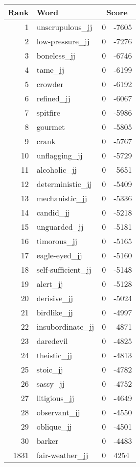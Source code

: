 \begin{longtable}[!htbp]{| rlr@{.}l |}
    \hline
    \textbf{Rank} & \textbf{Word} & \multicolumn{2}{c|}{\textbf{Score}} \\
    \hline
    \endhead
    1 & unscrupulous\_jj & 0 & -7605 \\
    2 & low-pressure\_jj & 0 & -7276 \\
    3 & boneless\_jj & 0 & -6746 \\
    4 & tame\_jj & 0 & -6199 \\
    5 & crowder & 0 & -6192 \\
    6 & refined\_jj & 0 & -6067 \\
    7 & spitfire & 0 & -5986 \\
    8 & gourmet & 0 & -5805 \\
    9 & crank & 0 & -5767 \\
    10 & unflagging\_jj & 0 & -5729 \\
    11 & alcoholic\_jj & 0 & -5651 \\
    12 & deterministic\_jj & 0 & -5409 \\
    13 & mechanistic\_jj & 0 & -5336 \\
    14 & candid\_jj & 0 & -5218 \\
    15 & unguarded\_jj & 0 & -5181 \\
    16 & timorous\_jj & 0 & -5165 \\
    17 & eagle-eyed\_jj & 0 & -5160 \\
    18 & self-sufficient\_jj & 0 & -5148 \\
    19 & alert\_jj & 0 & -5128 \\
    20 & derisive\_jj & 0 & -5024 \\
    21 & birdlike\_jj & 0 & -4997 \\
    22 & insubordinate\_jj & 0 & -4871 \\
    23 & daredevil & 0 & -4825 \\
    24 & theistic\_jj & 0 & -4813 \\
    25 & stoic\_jj & 0 & -4782 \\
    26 & sassy\_jj & 0 & -4752 \\
    27 & litigious\_jj & 0 & -4649 \\
    28 & observant\_jj & 0 & -4550 \\
    29 & oblique\_jj & 0 & -4501 \\
    30 & barker & 0 & -4483 \\
    1831 & fair-weather\_jj & 0 & 4254 \\

\end{longtable}
